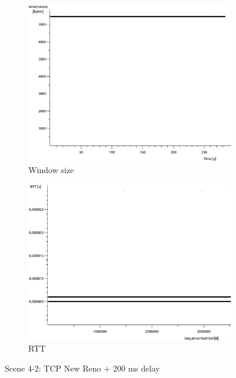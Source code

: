 \documentclass[conference,a4paper]{IEEEtran}
\begin{document}
\begin{figure}
\begin{subfigure}[b]{0.2\textwidth}
  \includegraphics[width=\textwidth]{s4-2_wnd}
  \caption{Window size}
 \end{subfigure}
 \begin{subfigure}[b]{0.2\textwidth}
  \includegraphics[width=\textwidth]{s4-2_rtt}
  \caption{RTT}
 \end{subfigure}
 \caption{Scene 4-2: TCP New Reno + 200 ms delay}
\end{figure}
\end{document}
